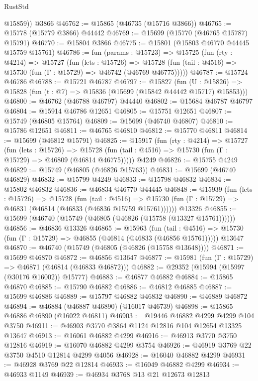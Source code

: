 \begin{lexlean}{RustStd}
\begin{coremodule}
        @15859))
    @3866
@46762 := @15865 (@46735 (@15716 @3866))
@46765 := @15778 (@15779 @3866) @44442
@46769 := @15699 (@15770 (@46765 @15787) @15791)
@46770 := @15804 @3866
@46775 := @15801 (@15803 @46770 @44445 @15759 @15761)
@46786 := fun (params : @15723) =>
  @15725
    (fun (rty : @4214) =>
    @15727
      (fun (lets : @15726) =>
      @15728 (fun (tail : @4516) => @15730 (fun (Γ : @15729) => @46742 (@46769 @46775)))))
@46787 := @15724 @46786
@46788 := @15721 @46787
@46797 := @15827
    (fun (U : @15826) => @15828 (fun (t : @7) => @15836 (@15699 (@15842 @44442 @15717) @15853)))
@46800 := @46762 (@46788 @46797) @44440
@46802 := @15684 @46787 @46797
@46804 := @15914 @46786 @12651
@46805 := @15751 @12651
@46807 := @15749 (@46805 @15764)
@46809 := @15699 (@46740 @46807)
@46810 := @15786 @12651
@46811 := @46765 @46810
@46812 := @15770 @46811
@46814 := @15699 (@46812 @15791)
@46825 := @15917
    (fun (rty : @4214) =>
    @15727
      (fun (lets : @15726) =>
      @15728 (fun (tail : @4516) => @15730 (fun (Γ : @15729) => @46809 (@46814 @46775)))))
    @4249
@46826 := @15755 @4249
@46829 := @15749 (@46805 (@46826 @15763))
@46831 := @15699 (@46740 @46829)
@46832 := @15799 @4249
@46833 := @15798 @46832
@46834 := @15802 @46832
@46836 := @46834 @46770 @44445
@46848 := @15939
    (fun (lets : @15726) =>
    @15728
      (fun (tail : @4516) =>
      @15730 (fun (Γ : @15729) => @46831 (@46814 (@46833 (@46836 @15759 @15761))))))
    @13326
@46855 := @15699 (@46740 (@15749 (@46805 (@46826 (@15758 (@13327 @15761))))))
@46856 := @46836 @13326
@46865 := @15963
    (fun (tail : @4516) => @15730 (fun (Γ : @15729) => @46855 (@46814 (@46833 (@46856 @15761)))))
    @13647
@46870 := @46740 (@15749 (@46805 (@46826 (@15758 @13648))))
@46871 := @15699 @46870
@46872 := @46856 @13647
@46877 := @15981 (fun (Γ : @15729) => @46871 (@46814 (@46833 @46872)))
@46882 := @29352 (@15994 (@15997 (@30176 @16002)) @15777)
@46883 := @46877 @46882
@46884 := @15865 @46870
@46885 := @15790 @46882
@46886 := @46812 @46885
@46887 := @15699 @46886
@46889 := @15797 @46882 @46832
@46890 := @46889 @46872
@46894 := @46884 (@46887 @46890) (@16017 @46739)
@46898 := @15865 @46886 @46890 (@16022 @46811)
@46903 := @19446 @46882 @4299 @4299 @104 @3750
@46911 := @46903 @3770 @3864 @1124 @12816 @104 @12654 @13325 @13647
@46913 := @16061 @46882 @4299
@46916 := @46913 @3770 @3750 @12816
@46919 := @16070 @46882 @4299 @3754
@46926 := @46919 @3769 @22 @3750 @4510 @12814 @4299 @4056
@46928 := @16040 @46882 @4299
@46931 := @46928 @3769 @22 @12814
@46933 := @16049 @46882 @4299
@46934 := @46933 @1149
@46939 := @46934 @3768 @13 @21 @12673 @12813

\end{coremodule}
\end{lexlean}
